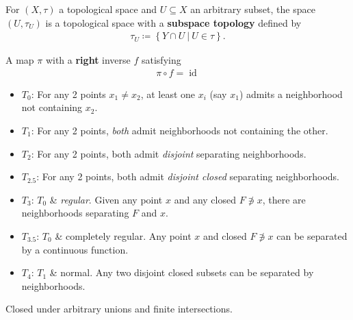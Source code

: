 \begin{definition}

For \((X, \tau)\) a topological space and \(U \subseteq X\) an arbitrary
subset, the space \((U, \tau_U)\) is a topological space with a
\textbf{subspace topology} defined by
\begin{align*}
\tau_U \coloneqq\left\{{Y \cap U {~\mathrel{\Big|}~}U \in \tau}\right\}
.\end{align*}

\end{definition}

\begin{definition}[Surjection]

A map \(\pi\) with a \textbf{right} inverse \(f\) satisfying
\begin{align*}\pi \circ f = \operatorname{id}\end{align*}

\end{definition}

\begin{definition}

\envlist

\begin{itemize}
\item
  \(T_0\): For any 2 points \(x_1\neq x_2\), at least one \(x_i\) (say
  \(x_1\)) admits a neighborhood not containing \(x_2\).
\item
  \(T_1\): For any 2 points, \emph{both} admit neighborhoods not
  containing the other.
\item
  \(T_2\): For any 2 points, both admit \emph{disjoint} separating
  neighborhoods.
\item
  \(T_{2.5}\): For any 2 points, both admit \emph{disjoint closed}
  separating neighborhoods.
\item
  \(T_3\): \(T_0\) \& \emph{regular}. Given any point \(x\) and any
  closed \(F\not\ni x\), there are neighborhoods separating \(F\) and
  \(x\).
\item
  \(T_{3.5}\): \(T_0\) \& completely regular. Any point \(x\) and closed
  \(F\not\ni x\) can be separated by a continuous function.
\item
  \(T_4\): \(T_1\) \& normal. Any two disjoint closed subsets can be
  separated by neighborhoods.
\end{itemize}

\end{definition}

\begin{definition}[Topology]

Closed under arbitrary unions and finite intersections.

\end{definition}

